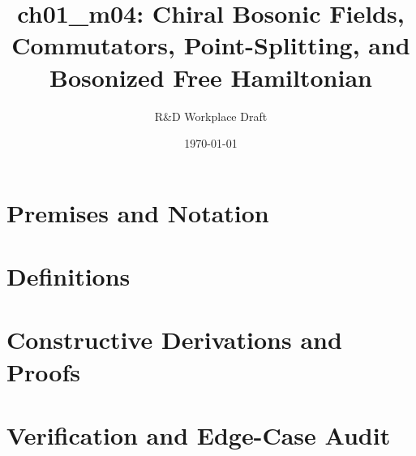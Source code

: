 \documentclass[11pt,a4paper]{article}
\title{\textbf{ch01\_m04: Chiral Bosonic Fields, Commutators, Point-Splitting, and Bosonized Free Hamiltonian}}
\author{R\&D Workplace Draft}
\date{\today}
\theoremstyle{definition}
\theoremstyle{plain}
\theoremstyle{remark}
\begin{document}
\maketitle

\section{Premises and Notation}

\section{Definitions}

\section{Constructive Derivations and Proofs}

\section{Verification and Edge-Case Audit}
\end{document}
